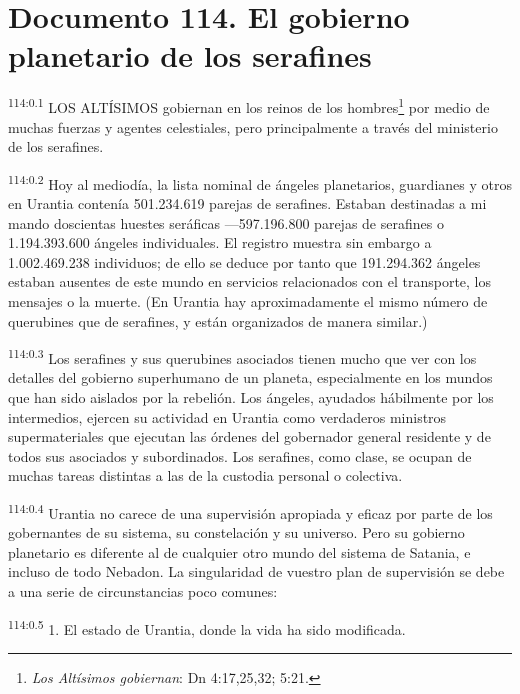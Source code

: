 \chapter{Documento 114. El gobierno planetario de los serafines}
\par
\textsuperscript{114:0.1} LOS ALTÍSIMOS gobiernan en los reinos de los hombres\footnote{\textit{Los Altísimos gobiernan}: Dn 4:17,25,32; 5:21.} por medio de muchas fuerzas y agentes celestiales, pero principalmente a través del ministerio de los serafines.

\par
\textsuperscript{114:0.2} Hoy al mediodía, la lista nominal de ángeles planetarios, guardianes y otros en Urantia contenía 501.234.619 parejas de serafines. Estaban destinadas a mi mando doscientas huestes seráficas ---597.196.800 parejas de serafines o 1.194.393.600 ángeles individuales. El registro muestra sin embargo a 1.002.469.238 individuos; de ello se deduce por tanto que 191.294.362 ángeles estaban ausentes de este mundo en servicios relacionados con el transporte, los mensajes o la muerte. (En Urantia hay aproximadamente el mismo número de querubines que de serafines, y están organizados de manera similar.)

\par
\textsuperscript{114:0.3} Los serafines y sus querubines asociados tienen mucho que ver con los detalles del gobierno superhumano de un planeta, especialmente en los mundos que han sido aislados por la rebelión. Los ángeles, ayudados hábilmente por los intermedios, ejercen su actividad en Urantia como verdaderos ministros supermateriales que ejecutan las órdenes del gobernador general residente y de todos sus asociados y subordinados. Los serafines, como clase, se ocupan de muchas tareas distintas a las de la custodia personal o colectiva.

\par
\textsuperscript{114:0.4} Urantia no carece de una supervisión apropiada y eficaz por parte de los gobernantes de su sistema, su constelación y su universo. Pero su gobierno planetario es diferente al de cualquier otro mundo del sistema de Satania, e incluso de todo Nebadon. La singularidad de vuestro plan de supervisión se debe a una serie de circunstancias poco comunes:

\par
\textsuperscript{114:0.5} 1. El estado de Urantia, donde la vida ha sido modificada.

